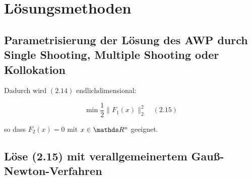 \section*{Lösungsmethoden}

\subsection*{Parametrisierung der Lösung des AWP durch Single Shooting, Multiple Shooting oder Kollokation}

Dadurch wird $(2.14)$ endlichdimensional:

\[ \min \frac 12 \|F_1(x)\|_2^2 \quad (2.15)\]

so dass $F_2(x) = 0$ mit $x \in \R^n$ geeignet.

\subsection*{Löse (2.15) mit verallgemeinertem Gauß-Newton-Verfahren}
